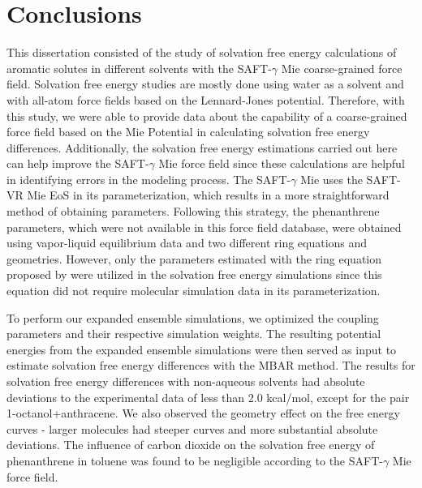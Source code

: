 \chapter{Conclusions} %

\label{Chapter6} 

This dissertation consisted of the study of solvation free energy calculations of aromatic solutes in different solvents with the SAFT-$\gamma$ Mie coarse-grained force field. Solvation free energy studies are mostly done using water as a solvent and with all-atom force fields based on the Lennard-Jones potential. Therefore, with this study, we were able to provide data about the capability of a coarse-grained force field based on the Mie Potential in calculating solvation free energy differences. Additionally, the solvation free energy estimations carried out here can help improve the SAFT-$\gamma$  Mie force field since these calculations are helpful in identifying errors in the modeling process. The SAFT-$\gamma$ Mie uses the SAFT-VR Mie EoS in its parameterization, which results in a more straightforward method of obtaining parameters. Following this strategy, the phenanthrene parameters, which were not available in this force field database, were obtained using vapor-liquid equilibrium data and two different ring equations and geometries. However, only the parameters estimated with the ring equation proposed by  were utilized in the solvation free energy simulations since this equation did not require molecular simulation data in its parameterization.

To perform our expanded ensemble simulations, we optimized the coupling parameters and their respective simulation weights. The resulting potential energies from the expanded ensemble simulations were then served as input to estimate solvation free energy differences with the MBAR method. The results for solvation free energy differences with non-aqueous solvents had absolute deviations to the experimental
data of less than 2.0 kcal/mol, except for the pair 1-octanol+anthracene. We also observed the geometry effect on the free energy curves - larger molecules had steeper curves and more substantial absolute deviations. The influence of carbon dioxide on the solvation free energy of phenanthrene in toluene was found to be negligible according to the SAFT-$\gamma$ Mie force field. 

